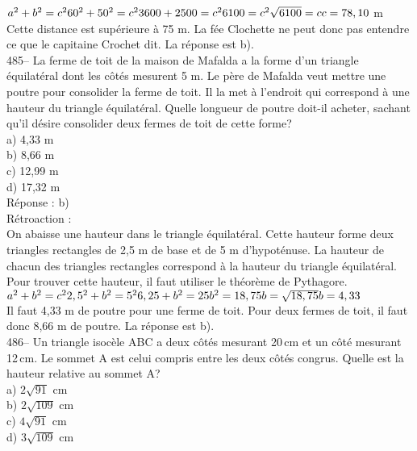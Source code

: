 ﻿\documentclass[letterpaper, 12pt]{article}
\begin{document}
$a^{2}+b^{2}=c^{2}\\
60^{2}+50^{2}=c^{2}\\
3600+2500=c^{2}\\
6100=c^{2}\\
\sqrt{6100}=c\\
c=78,10$ m\\
Cette distance est sup\'erieure \`a 75 m.  La f\'ee Clochette ne peut donc
pas entendre ce que le capitaine Crochet dit.  La r\'eponse est b).\\

485--  La ferme de toit de la maison de Mafalda a la forme d'un triangle
\'equilat\'eral dont les c\^ot\'es mesurent 5 m.  Le p\`ere de Mafalda veut
mettre une poutre pour consolider la ferme de toit.  Il la met \`a l'endroit
qui correspond \`a une hauteur du triangle \'equilat\'eral.  Quelle longueur
de poutre doit-il acheter, sachant qu'il d\'esire consolider deux fermes de
toit de cette forme?\\
a) 4,33 m\\
b) 8,66 m\\
c) 12,99 m\\
d) 17,32 m\\

R\'eponse : b)\\

R\'etroaction :\\
On abaisse une hauteur dans le triangle \'equilat\'eral.  Cette hauteur
forme deux triangles rectangles de 2,5 m de base et de 5 m d'hypot\'enuse.
La hauteur de chacun des triangles rectangles correspond \`a la hauteur du
triangle \'equilat\'eral.  Pour trouver cette hauteur, il faut utiliser le
th\'eor\`eme de Pythagore.\\

$a^{2}+b^{2}=c^{2}\\
2,5^{2}+b^{2}=5^{2}\\
6,25+b^{2}=25\\
b^{2}=18,75\\
b=\sqrt{18,75}\\
b=4,33$\\
Il faut 4,33 m de poutre pour une ferme de toit.  Pour deux fermes de toit,
il faut donc 8,66 m de poutre.  La r\'eponse est b).\\


486-- Un triangle isoc\`ele ABC a deux c\^ot\'es mesurant 20\,cm et un
c\^ot\'e mesurant 12\,cm.  Le sommet A est celui compris entre les deux
c\^ot\'es congrus.  Quelle est la hauteur relative au sommet A?\\
a) $2\sqrt{91}$ cm\\
b) $2\sqrt{109}$ cm\\
c) $4\sqrt{91}$ cm\\
d) $3\sqrt{109}$ cm\\
\end{document}
